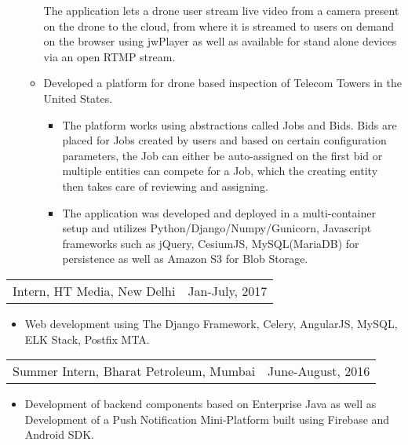 \documentclass[margin]{res}
\begin{document}
\begin{resume}
\begin{itemize}
\begin{itemize}
                      The application lets a drone user stream live video from a camera present on the drone to the cloud, from where it is streamed to users on demand on the browser using jwPlayer as well as available for stand alone devices via an open RTMP stream.
                      \item Developed a platform for drone based inspection of Telecom Towers in the United States. 
            	      \begin{itemize} 
            	      	\item The platform works using abstractions called Jobs and Bids. Bids are placed for Jobs created by users and based on certain configuration parameters, the Job can either be auto-assigned on the first bid or multiple entities can compete for a Job, which the creating entity then takes care of reviewing and assigning.
                      	\item The application was developed and deployed in a multi-container setup and utilizes Python/Django/Numpy/Gunicorn, Javascript 
                      	frameworks such as jQuery, CesiumJS, MySQL(MariaDB) for persistence as well as Amazon S3 for Blob Storage.
            	      \end{itemize}
                	\end{itemize}
       	\end{itemize} 
        \begin{tabular}{p{3.5in} r}
                Intern, HT Media, New Delhi & Jan-July, 2017  
        \end{tabular}	
		  \begin{itemize}
                   \item[] Web development using The Django Framework, Celery, AngularJS, MySQL, ELK Stack, Postfix MTA.
                  \end{itemize}
                 \begin{tabular}{p{3.5in} r} %
                  Summer Intern, Bharat Petroleum, Mumbai &  June-August, 2016
                 \end{tabular}
                  \begin{itemize}
                   \item[] Development of backend components based on Enterprise Java as well as Development of a Push Notification Mini-Platform built using Firebase and Android SDK.
                  \end{itemize}


\end{resume}
\end{document}
